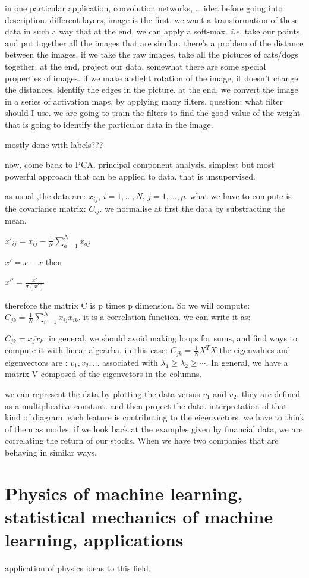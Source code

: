 \documentclass[a4paper]{tufte-book}
\newcommand{\hairsp}{\hspace{1pt}}%
\newcommand{\ie}{\textit{i.\hairsp{}e.}\xspace}
\newcommand{\nth}{\frac{1}{N}}
\newcommand{\sumin}{\sum_{i=1}^N}
\begin{document}
in one particular application, convolution networks, \dots
idea before going into description.
different layers, image is the first.
we want a transformation of these data in such a way that at the end, we can
apply a soft-max. \ie take our points, and put together all the images that are similar. there's a problem of the distance between the images. if we
take the raw images, take all the pictures of cats/dogs together.
at the end, project our data.
somewhat there are some special properties of images. if we make a slight 
rotation of the image, it doesn't change the distances.
identify the edges in the picture.
at the end, we convert the image in a series of activation maps, by applying
many filters. question: what filter should I use.
we are going to train the filters to find the good value of the weight that
is going to identify the particular data in the image.



mostly done with labels???


now, come back to PCA.
principal component analysis. simplest but most powerful approach that can be
applied to data.
that is unsupervised.

as usual ,the data are:
$x_{ij}$, $i = 1, \ldots, N$, $j=1,\ldots, p$.
what we have to compute is the covariance matrix:
$C_{ij}$. we normalise at first the data by substracting the mean.

$x'_{ij} = x_{ij} - \nth \sum_{a=1}^N x_{aj}$

$x' = x - \bar{x}$
then

$x'' = \frac{x'}{\sigma(x')}$

therefore the matrix C is p times p dimension.
So we will compute:
$C_{jk} = \nth \sumin x_{ij} x_{ik}$. it is a correlation function.
we can write it as:

$C_{jk} = \overline{x_j x_k}$.
in general, we should avoid making loops for sums, and find ways to compute it
with linear algearba. in this case:
$C_{jk} = \nth X^TX$
the eigenvalues and eigenvectors are :
$v_1, v_2, \ldots$ associated with $\lambda_1 \geq \lambda_2 \geq \cdots$.
In general, we have a matrix V composed of the eigenvetors in the columns.

we can represent the data by plotting the data versus $v_1$ and $v_2$.
they are defined as a multiplicative constant. and then project the data.
interpretation of that kind of diagram.
each feature is contributing to the eigenvectors. we have to think of them as
modes.
if we look back at the examples given by financial data, we are correlating the return of our stocks. When we have two companies that are behaving in
similar ways.










\chapter{Physics of machine learning, statistical mechanics of machine learning, applications}
\label{ch:physics}

application of physics ideas to this field.
\end{document}
